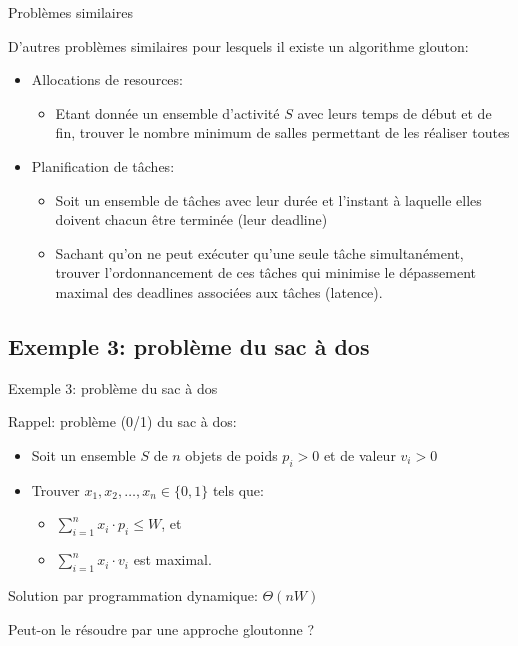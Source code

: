 \begin{frame}{Problèmes similaires}

D'autres problèmes similaires pour lesquels il existe un algorithme glouton:
\begin{itemize}
\item Allocations de resources:
\begin{itemize}
\item Etant donnée un ensemble d'activité $S$ avec leurs temps de début et de fin, trouver le nombre minimum de salles permettant de les réaliser toutes
\end{itemize}

\bigskip

\item Planification de tâches:
\begin{itemize}
\item Soit un ensemble de tâches avec leur durée et l'instant à laquelle elles doivent chacun être terminée (leur deadline)
\item Sachant qu'on ne peut exécuter qu'une seule tâche simultanément,
  trouver l'ordonnancement de ces tâches qui minimise le dépassement maximal des deadlines associées aux tâches (latence).
\end{itemize}
\end{itemize}

\end{frame}

\subsection{Exemple 3: problème du sac à dos}

\begin{frame}{Exemple 3: problème du sac à dos}

Rappel: problème (0/1) du sac à dos:
\begin{itemize}
\item Soit un ensemble $S$ de $n$ objets de poids $p_i>0$ et de valeur $v_i>0$
\item Trouver $x_1, x_2, \ldots, x_n \in \{0,1\}$ tels que:
\begin{itemize}
\item $\sum_{i=1}^n x_i\cdot p_i\leq W$, et
\item $\sum_{i=1}^n x_i\cdot v_i$ est maximal.
\end{itemize}
\end{itemize}

\bigskip

Solution par programmation dynamique: $\Theta(n W)$

\bigskip

Peut-on le résoudre par une approche gloutonne ?



\end{frame}


